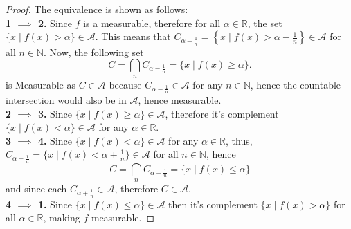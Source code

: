 \documentclass{article}
\theoremstyle{definition}
\theoremstyle{remark}
\theoremstyle{definition}
\theoremstyle{definition}
\theoremstyle{definition}
\newcommand{\bintrs}{\bigcap}
\newcommand{\where}{\;\vert\;}
\newcommand{\R}{\mathbb{R}}
\newcommand{\N}{\mathbb{N}}
\newcommand{\alg}[1]{\mathscr{#1}}
\begin{document}
\begin{proof}
	The equivalence is shown as follows:\\
	\textbf{1 $ \implies $ 2.} Since $ f $ is a measurable, therefore for all $ \alpha \in \R $, the set $ \{x\where f(x) > \alpha\} \in \alg{A}$. This means that $ C_{\alpha - \frac{1}{n}} =\left \{x\where f(x) > \alpha - \frac{1}{n} \right \} \in \alg{A}$ for all $ n\in \N $. Now, the following set 
	\[C = \bintrs_{n} C_{\alpha - \frac{1}{n}} = \{x\where f(x) \ge \alpha\}.\]
	is Measurable as $ C \in \alg{A} $ because $ C_{\alpha - \frac{1}{n}} \in \alg{A}$ for any $ n\in \N $, hence the countable intersection would also be in $ \alg{A} $, hence measurable.\\
	\textbf{2 $ \implies $ 3.}
	Since $ \{x\where f(x) \ge \alpha\} \in \alg{A} $, therefore it's complement $ \{x\where f(x) < \alpha\} \in \alg{A}$ for any $ \alpha \in \R $.\\
	\textbf{3 $ \implies $ 4.} Since $ \{x\where f(x)< \alpha\}\in \alg{A} $ for any $ \alpha\in \R $, thus, $ C_{\alpha +\frac{1}{n}} = \{x\where f(x) < \alpha + \frac{1}{n}\} \in \alg{A}$ for all $ n \in \N $, hence 
	\[C = \bintrs_{n} C_{\alpha + \frac{1}{n}} = \{x\where f(x)\le \alpha\}\]
	and since each $ C_{\alpha + \frac{1}{n}} \in \alg{A} $, therefore $ C \in \alg{A}$.\\
	\textbf{4 $ \implies $ 1.} Since $ \{x\where f(x) \le \alpha \} \in \alg{A} $ then it's complement $ \{x\where f(x) >\alpha\} $ for all $ \alpha \in \R $, making $ f $ measurable.
\end{proof}
\hrulefill
\end{document}
